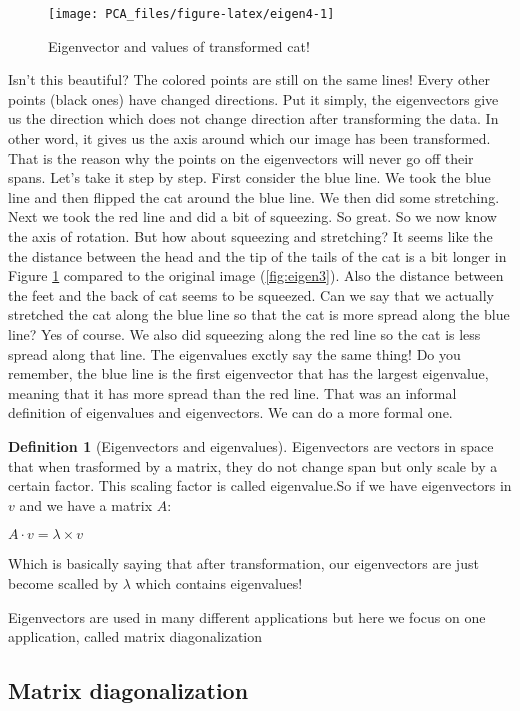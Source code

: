 \documentclass[
]{book}
\theoremstyle{definition}
\newtheorem{definition}{Definition}[chapter]
\theoremstyle{definition}
\theoremstyle{definition}
\theoremstyle{remark}
\begin{document}
\begin{figure}

{\centering \texttt{[image: PCA\_files/figure-latex/eigen4-1]} 

}

\caption{Eigenvector and values of transformed cat!}\label{fig:eigen4}
\end{figure}

Isn't this beautiful? The colored points are still on the same lines! Every other points (black ones) have changed directions. Put it simply, the eigenvectors give us the direction which does not change direction after transforming the data. In other word, it gives us the axis around which our image has been transformed. That is the reason why the points on the eigenvectors will never go off their spans. Let's take it step by step. First consider the blue line. We took the blue line and then flipped the cat around the blue line. We then did some stretching. Next we took the red line and did a bit of squeezing. So great. So we now know the axis of rotation. But how about squeezing and stretching? It seems like the the distance between the head and the tip of the tails of the cat is a bit longer in Figure \ref{fig:eigen4} compared to the original image (\ref{fig:eigen3}). Also the distance between the feet and the back of cat seems to be squeezed. Can we say that we actually stretched the cat along the blue line so that the cat is more spread along the blue line? Yes of course. We also did squeezing along the red line so the cat is less spread along that line. The eigenvalues exctly say the same thing! Do you remember, the blue line is the first eigenvector that has the largest eigenvalue, meaning that it has more spread than the red line. That was an informal definition of eigenvalues and eigenvectors. We can do a more formal one.

\begin{definition}[Eigenvectors and eigenvalues]
\protect\hypertarget{def:eigens}{}{\label{def:eigens} \iffalse (Eigenvectors and eigenvalues) \fi{} }Eigenvectors are vectors in space that when trasformed by a matrix, they do not change span but only scale by a certain factor. This scaling factor is called eigenvalue.So if we have eigenvectors in \(v\) and we have a matrix \(A\):

\(A \cdot v = \lambda \times v\)

Which is basically saying that after transformation, our eigenvectors are just become scalled by \(\lambda\) which contains eigenvalues!
\end{definition}

Eigenvectors are used in many different applications but here we focus on one application, called matrix diagonalization

\hypertarget{matrix-diagonalization}{%
\subsection{Matrix diagonalization}\label{matrix-diagonalization}}
\end{document}
